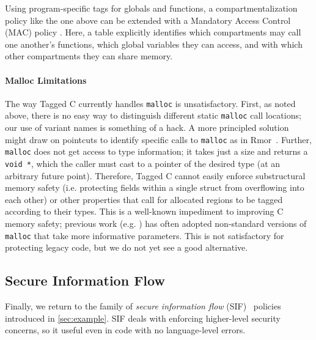 \documentclass{llncs}
\begin{document}
Using program-specific tags for globals and functions, a compartmentalization policy
like the one above can be extended with a Mandatory Access Control (MAC) policy \cite{Lampson74:Protection}.
Here, a table explicitly identifies which compartments may call one another's functions,
which global variables they can access, and with which other compartments they can share
memory.

\paragraph*{Malloc Limitations}
\label{sec:limitations}

The way Tagged C currently handles {\tt malloc} is unsatisfactory. First, as noted above, there is no
easy way to distinguish different static {\tt malloc} call locations; our use of
variant names is something of a hack.
A more principled solution might draw on pointcuts to identify specific calls to {\tt malloc}
as in {\sc Rmor}~\cite{Havelund08:RVC}.
Further, {\tt malloc} does not get access to type information;
it takes just a size and returns a {\tt void *}, which the caller must
cast to a pointer of the desired type (at an arbitrary future point).
Therefore, Tagged C cannot easily
enforce substructural memory safety (i.e. protecting fields within a single struct
from overflowing into each other) or other properties that call for allocated
regions to be tagged according to their types.
This is a well-known impediment to improving C memory safety;
previous work  (e.g. \cite{Michael23:MSWASM}) has often adopted non-standard
versions of {\tt malloc} that take more informative parameters. This is
not satisfactory for protecting legacy code, but we do not yet see a good alternative.

\subsection{Secure Information Flow}
\label{sec:SIF}

Finally, we return to the family of 
{\em secure information flow} (SIF)~\cite{Denning77:SecureInformationFlow} policies
introduced in \cref{sec:example}. 
SIF deals with enforcing higher-level security concerns, so it useful even in code with no language-level errors.
\end{document}
